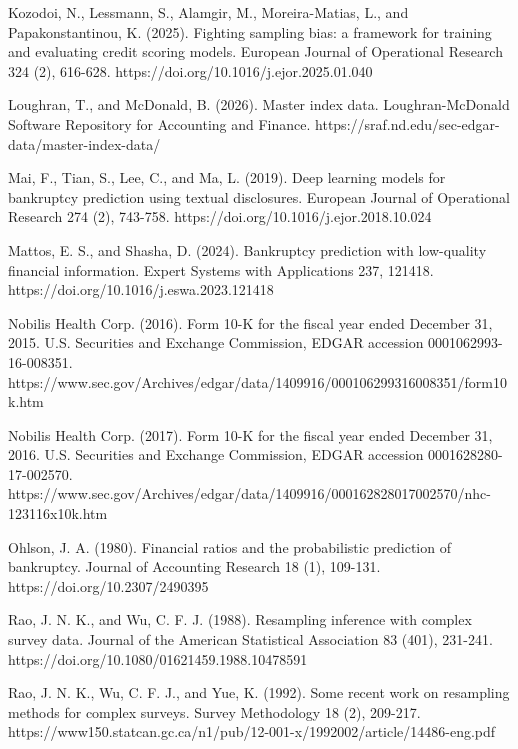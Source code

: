 \documentclass[10pt,a4paper,twocolumn]{article}
\begin{document}
\noindent Kozodoi, N., Lessmann, S., Alamgir, M., Moreira-Matias, L., and Papakonstantinou, K. (2025). Fighting sampling bias: a framework for training and evaluating credit scoring models. European Journal of Operational Research 324 (2), 616-628. https://doi.org/10.1016/j.ejor.2025.01.040\par\vspace{2pt}
\noindent Loughran, T., and McDonald, B. (2026). Master index data. Loughran-McDonald Software Repository for Accounting and Finance. https://sraf.nd.edu/sec-edgar-data/master-index-data/\par\vspace{2pt}
\noindent Mai, F., Tian, S., Lee, C., and Ma, L. (2019). Deep learning models for bankruptcy prediction using textual disclosures. European Journal of Operational Research 274 (2), 743-758. https://doi.org/10.1016/j.ejor.2018.10.024\par\vspace{2pt}
\noindent Mattos, E. S., and Shasha, D. (2024). Bankruptcy prediction with low-quality financial information. Expert Systems with Applications 237, 121418. https://doi.org/10.1016/j.eswa.2023.121418\par\vspace{2pt}
\noindent Nobilis Health Corp. (2016). Form 10-K for the fiscal year ended December 31, 2015. U.S. Securities and Exchange Commission, EDGAR accession 0001062993-16-008351. https://www.sec.gov/Archives/edgar/data/1409916/000106299316008351/form10k.htm\par\vspace{2pt}
\noindent Nobilis Health Corp. (2017). Form 10-K for the fiscal year ended December 31, 2016. U.S. Securities and Exchange Commission, EDGAR accession 0001628280-17-002570. https://www.sec.gov/Archives/edgar/data/1409916/000162828017002570/nhc-123116x10k.htm\par\vspace{2pt}
\noindent Ohlson, J. A. (1980). Financial ratios and the probabilistic prediction of bankruptcy. Journal of Accounting Research 18 (1), 109-131. https://doi.org/10.2307/2490395\par\vspace{2pt}
\noindent Rao, J. N. K., and Wu, C. F. J. (1988). Resampling inference with complex survey data. Journal of the American Statistical Association 83 (401), 231-241. https://doi.org/10.1080/01621459.1988.10478591\par\vspace{2pt}
\noindent Rao, J. N. K., Wu, C. F. J., and Yue, K. (1992). Some recent work on resampling methods for complex surveys. Survey Methodology 18 (2), 209-217. https://www150.statcan.gc.ca/n1/pub/12-001-x/1992002/article/14486-eng.pdf\par\vspace{2pt}
\end{document}
